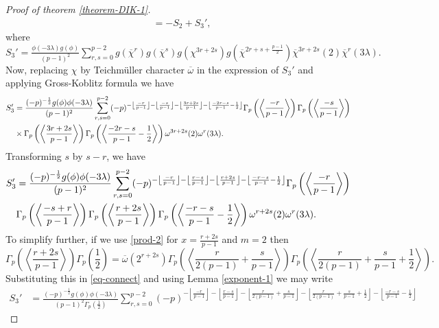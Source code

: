 \documentclass[12pt]{amsart}
\theoremstyle{plain}
\theoremstyle{definition}
\theoremstyle{remark}
\numberwithin{equation}{section}
\begin{document}
\begin{proof}[Proof of theorem \ref{theorem-DIK-1}]
\begin{align}
&=-S_2+S_3',
\end{align}
where $S_3'=\frac{\phi(-3\lambda)g(\phi)}{(p-1)^2} \sum\limits_{r,s=0}^{p-2} g(\overline{\chi}^{r}) g(\overline{\chi}^{s}) g(\chi^{3r+2s}) g\left(\overline{\chi}^{2r + s + \frac{p-1}{2}}\right) \overline{\chi}^{3r+2s}(2)\overline{\chi}^{r}(3\lambda).$
Now, replacing $\chi$ by Teichm\"{u}ller character $\overline{\omega}$ in the expression of $S_3'$ and applying Gross-Koblitz formula we have 
\begin{align}
S_3'&=\frac{(-p)^{-\frac{1}{2}}g(\phi) \phi(-3\lambda)}{(p-1)^2} \sum_{r,s=0}^{p-2}(-p)^{-\left\lfloor\frac{-r}{p-1}\right\rfloor-\left\lfloor\frac{-s}{p-1}\right\rfloor-\left\lfloor\frac{3r+2s}{p-1}\right\rfloor-\left\lfloor\frac{-2r-s}{p-1}-\frac{1}{2}\right\rfloor}\Gamma_p\left(\left\langle\frac{-r}{p-1}\right\rangle\right) \Gamma_p\left(\left\langle\frac{-s}{p-1}\right\rangle\right)\notag \\
&\times \Gamma_p\left(\left\langle\frac{3r+2s}{p-1}\right\rangle\right)\Gamma_p\left(\left\langle\frac{-2r-s}{p-1}-\frac{1}{2}\right\rangle\right){\omega}^{3r+2s}(2){\omega}^{r}(3\lambda). \notag
\end{align}
Transforming $s$ by $s-r$, we have
\begin{align}\label{eq-connect}
S_3'&=\frac{(-p)^{-\frac{1}{2}}g(\phi) \phi(-3\lambda)}{(p-1)^2} 
\sum_{r,s=0}^{p-2}(-p)^{-\left\lfloor\frac{-r}{p-1}\right\rfloor-\left\lfloor\frac{r-s}{p-1}\right\rfloor-\left\lfloor\frac{r+2s}{p-1}\right\rfloor-\left\lfloor\frac{-r-s}{p-1}-\frac{1}{2}\right\rfloor}\Gamma_p\left(\left\langle\frac{-r}{p-1}\right\rangle\right)\notag\\ 
  &\Gamma_p\left(\left\langle\frac{-s+r}{p-1}\right\rangle\right)\Gamma_p\left(\left\langle\frac{r+2s}{p-1}\right\rangle\right)\Gamma_p\left(\left\langle\frac{-r-s}{p-1}-\frac{1}{2}\right\rangle\right){\omega}^{r+2s}(2) {\omega}^{r}(3\lambda).
\end{align}
To simplify further, if we use \eqref{prod-2} for $x=\frac{r+2s}{p-1}$ and $m=2$ then
 $$\Gamma_p\left(\left\langle\frac{r+2s}{p-1}\right\rangle\right)\Gamma_p\left(\frac{1}{2}\right)=\overline{\omega}(2^{r+2s})\Gamma_p\left(\left\langle\frac{r}{2(p-1)}+\frac{s}{p-1}\right\rangle\right)\Gamma_p\left(\left\langle\frac{r}{2(p-1)}+\frac{s}{p-1}+\frac{1}{2}\right\rangle\right).$$
 Substituting this in \eqref{eq-connect} and using Lemma \ref{exponent-1} we may write
  \begin{align}
 S_3'&=\frac{(-p)^{-\frac{1}{2}}g(\phi) \phi(-3\lambda)}{(p-1)^2\Gamma_p\left(\frac{1}{2}\right)} \sum_{r,s=0}^{p-2}(-p)^{-\left\lfloor\frac{-r}{p-1}\right\rfloor-\left\lfloor\frac{r-s}{p-1}\right\rfloor-\left\lfloor\frac{r}{2(p-1)}+\frac{s}{p-1}\right\rfloor-\left\lfloor\frac{r}{2(p-1)}+\frac{s}{p-1}+\frac{1}{2}\right\rfloor-\left\lfloor\frac{-r-s}{p-1}-\frac{1}{2}\right\rfloor}

\end{align}
\end{proof}
\end{document}
